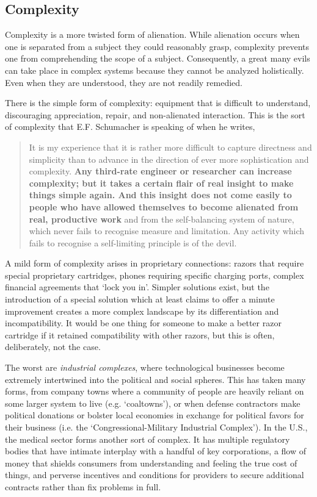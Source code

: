 \documentclass[letterpaper]{article}
\begin{document}
\subsection{Complexity}

Complexity is a more twisted form of alienation. While alienation occurs when one is separated from a subject they could reasonably grasp, complexity prevents one from comprehending the scope of a subject. Consequently, a great many evils can take place in complex systems because they cannot be analyzed holistically. Even when they are understood, they are not readily remedied.

There is the simple form of complexity: equipment that is difficult to understand, discouraging appreciation, repair, and non-alienated interaction. This is the sort of complexity that E.F. Schumacher is speaking of when he writes,

\begin{quote}
  It is my experience that it is rather more difficult to capture directness and simplicity than to advance in the direction of ever more sophistication and complexity. \textbf{Any third-rate engineer or researcher can increase complexity; but it takes a certain flair of real insight to make things simple again. And this insight does not come easily to people who have allowed themselves to become alienated from real, productive work} and from the self-balancing system of nature, which never fails to recognise measure and limitation. Any activity which fails to recognise a self-limiting principle is of the devil.
\end{quote}

A mild form of complexity arises in proprietary connections: razors that require special proprietary cartridges, phones requiring specific charging ports, complex financial agreements that `lock you in'. Simpler solutions exist, but the introduction of a special solution which at least claims to offer a minute improvement creates a more complex landscape by its differentiation and incompatibility. It would be one thing for someone to make a better razor cartridge if it retained compatibility with other razors, but this is often, deliberately, not the case.

The worst are \textit{industrial complexes}, where technological businesses become extremely intertwined into the political and social spheres. This has taken many forms, from company towns where a community of people are heavily reliant on some larger system to live (e.g. `coaltowns'), or when defense contractors make political donations or bolster local economies in exchange for political favors for their business (i.e. the `Congressional-Military Industrial Complex'). In the U.S., the medical sector forms another sort of complex. It has multiple regulatory bodies that have intimate interplay with a handful of key corporations, a flow of money that shields consumers from understanding and feeling the true cost of things, and perverse incentives and conditions for providers to secure additional contracts rather than fix problems in full.
\end{document}

